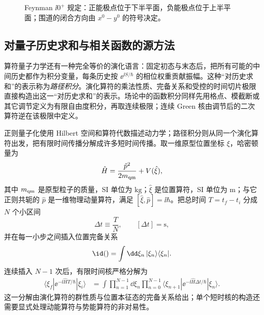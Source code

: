 \begin{figure}[htbp]
\centering

\caption{Feynman $\ii0^+$ 规定：正能极点位于下半平面，负能极点位于上半平面；围道的闭合方向由 $x^0-y^0$ 的符号决定。}
\label{fig:feynman-poles-r2}
\end{figure}

\subsection{对量子历史求和与相关函数的源方法}

算符量子力学还有一种完全等价的演化语言：固定初态与末态后，把所有可能的中间历史都作为积分变量，每条历史按 $\ee^{\ii S/\hbar}$ 的相位权重贡献振幅。这种“对历史求和”的表示称为\emph{路径积分}。演化算符的乘法性质、完备关系和受控的时间切片极限直接构造出这一“对历史求和”的表示。场论中的函数积分同样先用格点、模截断或其它调节定义为有限自由度积分，再取连续极限；连续 Green 核由调节后的二次算符逆在该极限中定义。

正则量子化使用 Hilbert 空间和算符代数描述动力学；路径积分则从同一个演化算符出发，把有限时间传播分解成许多短时间传播。取一维原型位置坐标 $\xi$，哈密顿量为
\begin{equation*}
 \hat H=\frac{\hat p^2}{2m_{\rm qm}}+V(\hat\xi),
\end{equation*}
其中 $m_{\rm qm}$ 是原型粒子的质量，SI 单位为 $\mathrm{kg}$；$\hat\xi$ 是位置算符，SI 单位为 $\mathrm m$；与它正则共轭的 $\hat p$ 是一维物理动量算符，满足 $[\hat\xi,\hat p]=\ii\hbar$。把总时间 $T=t_f-t_i$ 分成 $N$ 个小区间
\begin{equation*}
 \Delta t\equiv\frac{T}{N},
 \qquad [\Delta t]=\mathrm s,
\end{equation*}
并在每一小步之间插入位置完备关系
\begin{equation*}
 \id()=\int\dd \xi_n\,|\xi_n\rangle\langle \xi_n|.
\end{equation*}
连续插入 $N-1$ 次后，有限时间核严格分解为
\begin{align}
 \langle \xi_f|\ee^{-\ii \hat H T/\hbar}|\xi_i\rangle
 &=\int\prod_{n=1}^{N-1}\dd \xi_n
 \prod_{n=0}^{N-1}
 \langle \xi_{n+1}|\ee^{-\ii \hat H\Delta t/\hbar}|\xi_n\rangle.
 \label{eq:path-slicing-r15}
\end{align}
这一分解由演化算符的群性质与位置本征态的完备关系给出；单个短时核的构造还需要显式处理动能算符与势能算符的非对易性。

